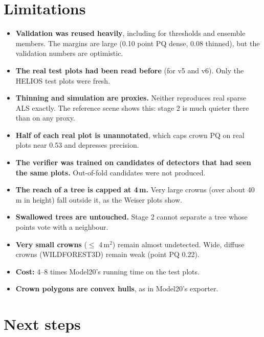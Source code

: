 \documentclass[11pt,a4paper]{article}
\newcommand{\sqm}{m$^2$}
\newcommand{\col}[1]{\textsf{#1}}
\begin{document}
\section{Limitations}

\begin{itemize}
  \item \textbf{Validation was reused heavily}, including for thresholds and ensemble members. The margins are large (0.10 point PQ dense, 0.08 thinned), but the validation numbers are optimistic.
  \item \textbf{The real test plots had been read before} (for v5 and v6). Only the HELIOS test plots were fresh.
  \item \textbf{Thinning and simulation are proxies.} Neither reproduces real sparse ALS exactly. The reference scene shows this: stage 2 is much quieter there than on any proxy.
  \item \textbf{Half of each real plot is unannotated}, which caps crown PQ on real plots near 0.53 and depresses precision.
  \item \textbf{The verifier was trained on candidates of detectors that had seen the same plots.} Out-of-fold candidates were not produced.
  \item \textbf{The reach of a tree is capped at 4\,m.} Very large crowns (over about 40\,m in height) fall outside it, as the Weiser plots show.
  \item \textbf{Swallowed trees are untouched.} Stage 2 cannot separate a tree whose points vote with a neighbour.
  \item \textbf{Very small crowns} ($\leq$ 4\,\sqm) remain almost undetected. Wide, diffuse crowns (\col{WILDFOREST3D}) remain weak (point PQ 0.22).
  \item \textbf{Cost:} 4--8 times Model20's running time on the test plots.
  \item \textbf{Crown polygons are convex hulls}, as in Model20's exporter.
\end{itemize}

\section{Next steps}
\label{sec:next}
\end{document}
